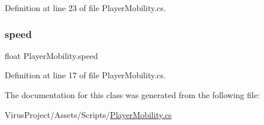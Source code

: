 Definition at line 23 of file Player\+Mobility.\+cs.

\hypertarget{class_player_mobility_a336d35b5a58fc1ea25c0cb8eb88858f0}{}\label{class_player_mobility_a336d35b5a58fc1ea25c0cb8eb88858f0} 
\subsubsection{\texorpdfstring{speed}{speed}}
{\footnotesize\ttfamily float Player\+Mobility.\+speed}



Definition at line 17 of file Player\+Mobility.\+cs.



The documentation for this class was generated from the following file\+:\begin{DoxyCompactItemize}
\item 
Virus\+Project/\+Assets/\+Scripts/\hyperlink{_player_mobility_8cs}{Player\+Mobility.\+cs}\end{DoxyCompactItemize}
